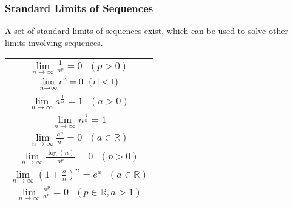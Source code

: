 \documentclass[12pt]{report}
\newenvironment{formulalist}{
    \renewcommand{\arraystretch}{2}
    \begin{center}    
        \begin{tabular}{||c||}
}{
        \end{tabular}
    \end{center}
    \renewcommand{\arraystretch}{1}
}
\newcommand{\R}{\mathbb{R}}
\newcommand{\limit}{\lim\limits}
\begin{document}
\begin{flushleft}
\subsubsection*{Standard Limits of Sequences}
A set of standard limits of sequences exist, which can be used to solve other
limits involving sequences.

\begin{formulalist}
    \(\limit_{n\rightarrow\infty}\frac{1}{n^p} = 0 \:\:\:(p > 0)\) \\
    \(\limit_{n\rightarrow\infty} r^n = 0 \:\:\:(\abs{r} < 1)\) \\
    \(\limit_{n\rightarrow\infty} a^{\frac{1}{n}} = 1 \:\:\:(a > 0)\) \\
    \(\limit_{n\rightarrow\infty} n^{\frac{1}{n}} = 1\) \\
    \(\limit_{n\rightarrow\infty} \frac{a^n}{n!} = 0 \:\:\:(a \in \R)\) \\
    \(\limit_{n\rightarrow\infty} \frac{\log(n)}{n^p} = 0 \:\:\:(p > 0)\) \\
    \(\limit_{n\rightarrow\infty} \left(1 + \frac{a}{n}\right)^n 
    = e^a \:\:\:(a \in \R)\) \\
    \(\limit_{n\rightarrow\infty} \frac{n^p}{a^n} 
    = 0 \:\:\:(p \in \R, a > 1)\) \\  
\end{formulalist}


\end{flushleft}
\end{document}
